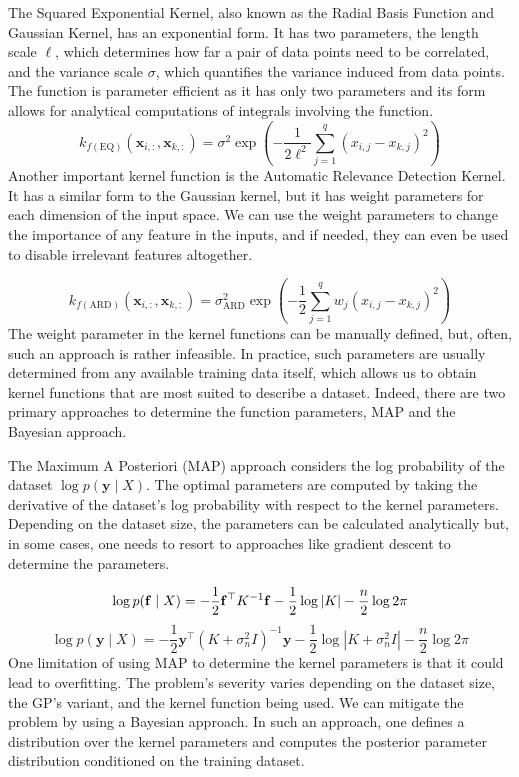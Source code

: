 \documentclass[letterpaper,11pt]{extarticle}
\begin{document}
The Squared Exponential Kernel, also known as the Radial Basis Function and Gaussian Kernel, has an exponential form. It has two parameters, the length scale $\ell$, which determines how far a pair of data points need to be correlated, and the variance scale $\sigma$, which quantifies the variance induced from data points. The function is parameter efficient as it has only two parameters and its form allows for analytical computations of integrals involving the function. 
$$
k_{f(\mathrm{EQ})}\left(\mathbf{x}_{i,:}, \mathbf{x}_{k,:}\right)=\sigma^{2} \exp \left(-\frac{1}{2 \ell^{2}} \sum_{j=1}^{q}\left(x_{i, j}-x_{k, j}\right)^{2}\right)
$$
Another important kernel function is the Automatic Relevance Detection Kernel. It has a similar form to the Gaussian kernel, but it has weight parameters for each dimension of the input space. We can use the weight parameters to change the importance of any feature in the inputs, and if needed, they can even be used to disable irrelevant features altogether. 

$$
k_{f(\mathrm{ARD})}\left(\mathbf{x}_{i,:}, \mathbf{x}_{k,:}\right)=\sigma_{\mathrm{ARD}}^{2} \exp \left(-\frac{1}{2} \sum_{j=1}^{q} w_{j}\left(x_{i, j}-x_{k, j}\right)^{2}\right)
$$
The weight parameter in the kernel functions can be manually defined, but, often, such an approach is rather infeasible. In practice, such parameters are usually determined from any available training data itself, which allows us to obtain kernel functions that are most suited to describe a dataset. Indeed, there are two primary approaches to determine the function parameters, MAP and the Bayesian approach. 

The Maximum A Posteriori (MAP) approach considers the log probability of the dataset $\log p(\mathbf{y} \mid X)$. The optimal parameters are computed by taking the derivative of the dataset's log probability with respect to the kernel parameters. Depending on the dataset size, the parameters can be calculated analytically but, in some cases, one needs to resort to approaches like gradient descent to determine the parameters. 

$$
\log p(\mathbf{f} \mid X)=-\frac{1}{2} \mathbf{f}^{\top} K^{-1} \mathbf{f}-\frac{1}{2} \log |K|-\frac{n}{2} \log 2 \pi \\
$$
$$
\log p(\mathbf{y} \mid X)=-\frac{1}{2} \mathbf{y}^{\top}\left(K+\sigma_{n}^{2} I\right)^{-1} \mathbf{y}-\frac{1}{2} \log \left|K+\sigma_{n}^{2} I\right|-\frac{n}{2} \log 2 \pi
$$
One limitation of using MAP to determine the kernel parameters is that it could lead to overfitting. The problem's severity varies depending on the dataset size, the GP's variant, and the kernel function being used. We can mitigate the problem by using a Bayesian approach. In such an approach, one defines a distribution over the kernel parameters and computes the posterior parameter distribution conditioned on the training dataset. 
\end{document}
